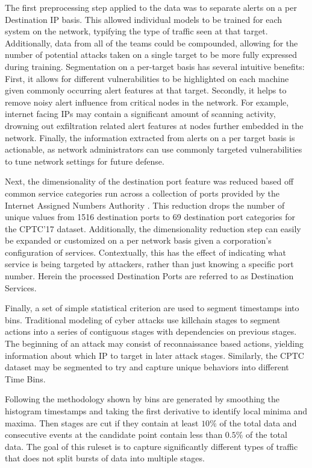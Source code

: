 The first preprocessing step applied to the data was to separate alerts on a per Destination IP basis. This allowed individual models to be trained for each system on the network, typifying the type of traffic seen at that target. Additionally, data from all of the teams could be compounded, allowing for the number of potential attacks taken on a single target to be more fully expressed during training. Segmentation on a per-target basis has several intuitive benefits: First, it allows for different vulnerabilities to be highlighted on each machine given commonly occurring alert features at that target. Secondly, it helps to remove noisy alert influence from critical nodes in the network. For example, internet facing IPs may contain a significant amount of scanning activity, drowning out exfiltration related alert features at nodes further embedded in the network. Finally, the information extracted from alerts on a per target basis is actionable, as network administrators can use commonly targeted vulnerabilities to tune network settings for future defense. 

Next, the dimensionality of the destination port feature was reduced based off common service categories run across a collection of ports provided by the Internet Assigned Numbers Authority \cite{iana}. This reduction drops the number of unique values from 1516 destination ports to 69 destination port categories for the CPTC'17 dataset. Additionally, the dimensionality reduction step can easily be expanded or customized on a per network basis given a corporation's configuration of services. Contextually, this has the effect of indicating what service is being targeted by attackers, rather than just knowing a specific port number. Herein the processed Destination Ports are referred to as Destination Services. 

Finally, a set of simple statistical criterion are used to segment timestamps into bins. Traditional modeling of cyber attacks use killchain stages to segment actions into a series of contiguous stages with dependencies on previous stages. The beginning of an attack may consist of reconnaissance based actions, yielding information about which IP to target in later attack stages. Similarly, the CPTC dataset may be segmented to try and capture unique behaviors into different Time Bins. 

Following the methodology shown by \cite{us} bins are generated by smoothing the histogram timestamps and taking the first derivative to identify local minima and maxima. Then stages are cut if they contain at least $10\%$ of the total data and consecutive events at the candidate point contain less than $0.5\%$ of the total data. The goal of this ruleset is to capture significantly different types of traffic that does not split bursts of data into multiple stages.

